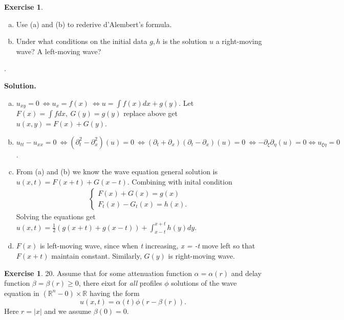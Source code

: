\documentclass[a4paper]{book}
\newenvironment{solution}%
{\noindent\textbf{Solution.}}%
{\qedhere}
\numberwithin{equation}{chapter}
\theoremstyle{definition}
\newtheorem{exc}[exm]{Exercise}
\begin{document}
\begin{multicols}{2}
\begin{exc}
\begin{enumerate} [(a)]
  \item Use (a) and (b) to rederive d'Alembert's formula.

  \item Under what conditions on the initial data $g,h$ is the solution $u$ a right-moving wave? A left-moving wave?
    
  \end{enumerate}.
\end{exc}

\begin{solution}
  \begin{enumerate}[(a)]
  \item $u_{xy} = 0\ \Longleftrightarrow u_x = f(x)\ \Longleftrightarrow u = \int f(x)dx + g(y)$. Let $F(x) = \int f dx, \ G(y) = g(y)$ replace above get $u(x,y) = F(x) + G(y)$.

  \item $u_{tt} - u_{xx} = 0\ \Longleftrightarrow (\partial^2_t - \partial^2_x)(u) = 0\ \Longleftrightarrow (\partial_t + \partial_x)(\partial_t - \partial_x)(u) = 0 \ \Longleftrightarrow -\partial_{\xi} \partial_\eta (u) = 0 \Longleftrightarrow u_{\xi \eta} = 0$.

  \item From (a) and (b) we know the wave equation general solution is $u(x,t) = F(x+t) + G(x-t)$. Combining with inital condition
    \begin{align*}
      \begin{cases}
        F(x) + G(x) = g(x)   \\
        F_t(x) - G_t(x) = h(x).
      \end{cases}
    \end{align*}
    Solving the equations get $u(x,t) = \frac{1}{2}(g(x+t) + g(x-t)) + \int_{x-t}^{x+t} h(y) dy$.

    \item $F(x)$ is left-moving wave, since when \textit{t} increasing, \textit{x = -t} move left so that $F(x+t)$ maintain constant. Similarly, $G(y)$ is right-moving wave.
  \end{enumerate}
\end{solution}

\begin{exc}
  20.
  Assume that for some attenuation function $\alpha = \alpha(r) $ and delay function $\beta = \beta(r) \geq 0$, there eixst for \textit{all} profiles $\phi$ solutions of the wave equation in $(\mathbb{R}^n - {0}) \times \mathbb{R}$ having the form
  \begin{equation}
    \label{eq:3}
    u(x,t) = \alpha(t) \phi(r - \beta(r)).
  \end{equation}
  Here $r = |x|$ and we assume $\beta(0) = 0$.


\end{exc}
\end{multicols}
\end{document}
